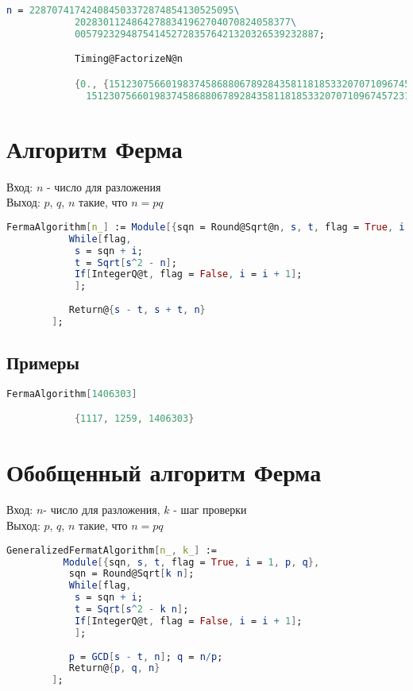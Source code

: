 	    	\begin{lstlisting}[language=Mathematica,caption={
	      		Пример 2
	    	}]
			n = 228707417424084503372874854130525095\
			20283011248642788341962704070824058377\
			0057923294875414527283576421320326539232887;

			Timing@FactorizeN@n

			{0., {15123075660198374586880678928435811818533207071096745723349, 
			  15123075660198374586880678928435811818533207071096745723163}}
	    	\end{lstlisting}

	\section{Алгоритм Ферма}
		Вход: $n$ - число для разложения \\
		Выход: $p$, $q$, $n$ такие, что $n = p q$

		\begin{lstlisting}[language=Mathematica,caption={
      		Алгоритм Ферма	
    	}]
		FermaAlgorithm[n_] := Module[{sqn = Round@Sqrt@n, s, t, flag = True, i = 1},
		   While[flag,
		    s = sqn + i;
		    t = Sqrt[s^2 - n];
		    If[IntegerQ@t, flag = False, i = i + 1];
		    ];
		   
		   Return@{s - t, s + t, n}
		];
    	\end{lstlisting}

    	\subsection{Примеры}

	    	\begin{lstlisting}[language=Mathematica,caption={
	      		Пример 1
	    	}]
			FermaAlgorithm[1406303]

			{1117, 1259, 1406303}
	    	\end{lstlisting}

	\section{Обобщенный алгоритм Ферма}
		Вход: $n $- число для разложения, $k$ - шаг проверки \\
		Выход: $p$, $q$, $n$ такие, что $n = p q$

		\begin{lstlisting}[language=Mathematica,caption={
      		Обобщенный алгоритм Ферма	
    	}]
		GeneralizedFermatAlgorithm[n_, k_] := 
		  Module[{sqn, s, t, flag = True, i = 1, p, q},
		   sqn = Round@Sqrt[k n];
		   While[flag,
		    s = sqn + i;
		    t = Sqrt[s^2 - k n];
		    If[IntegerQ@t, flag = False, i = i + 1];
		    ];
		   
		   p = GCD[s - t, n]; q = n/p;
		   Return@{p, q, n}
		];
    	\end{lstlisting}

